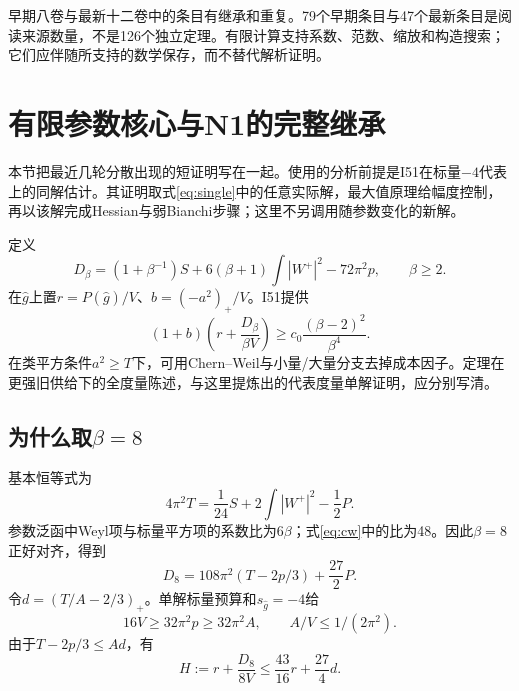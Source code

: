\documentclass[UTF8,fontset=fandol,zihao=-4,a4paper]{ctexart}
\theoremstyle{remark}
\begin{document}
早期八卷与最新十二卷中的条目有继承和重复。79个早期条目与47个最新条目是阅读来源数量，不是126个独立定理。有限计算支持系数、范数、缩放和构造搜索；它们应伴随所支持的数学保存，而不替代解析证明。

\section{有限参数核心与N1的完整继承}
\label{sec:n1}

本节把最近几轮分散出现的短证明写在一起。使用的分析前提是I51在标量$-4$代表上的同解估计。其证明取式\eqref{eq:single}中的任意实际解，最大值原理给幅度控制，再以该解完成Hessian与弱Bianchi步骤；这里不另调用随参数变化的新解。

定义
\begin{equation}
D_\beta=(1+\beta^{-1})S+6(\beta+1)\int|W^+|^2-72\pi^2p,
\qquad\beta\ge2.
\label{eq:pencil}
\end{equation}
在$\widehat g$上置$r=P(\widehat g)/V$、$b=(-a^2)_+/V$。I51提供
\begin{equation}
(1+b)\left(r+\frac{D_\beta}{\beta V}\right)
\ge c_0\frac{(\beta-2)^2}{\beta^4}.
\label{eq:i51}
\end{equation}
在类平方条件$a^2\ge T$下，可用Chern--Weil与小量/大量分支去掉成本因子。定理在更强旧供给下的全度量陈述，与这里提炼出的代表度量单解证明，应分别写清。

\subsection{为什么取\texorpdfstring{$\beta=8$}{β=8}}

基本恒等式为
\begin{equation}
4\pi^2T=\frac1{24}S+2\int|W^+|^2-\frac12P.
\label{eq:cw}
\end{equation}
参数泛函中Weyl项与标量平方项的系数比为$6\beta$；式\eqref{eq:cw}中的比为48。因此$\beta=8$正好对齐，得到
\begin{equation}
D_8=108\pi^2(T-2p/3)+\frac{27}{2}P.
\label{eq:d8}
\end{equation}
令$d=(T/A-2/3)_+$。单解标量预算和$s_{\widehat g}=-4$给
\begin{equation}
16V\ge32\pi^2p\ge32\pi^2A,
\qquad A/V\le1/(2\pi^2).
\label{eq:scalarbudget}
\end{equation}
由于$T-2p/3\le Ad$，有
\begin{equation}
H:=r+\frac{D_8}{8V}
\le\frac{43}{16}r+\frac{27}{4}d.
\label{eq:Hupper}
\end{equation}
\end{document}
